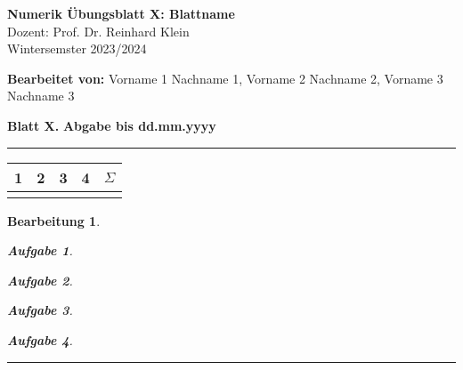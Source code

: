 \documentclass[12pt]{article}
\theoremstyle{Aufgabe_Style}
\newtheorem{Aufgabe}{Aufgabe}
\theoremstyle{Bearbeitung_Style}
\newtheorem*{Bearbeitung}{Bearbeitung}
\begin{document}
\newcommand{\studentnames}{Vorname 1 Nachname 1, Vorname 2 Nachname 2, Vorname 3 Nachname 3}
\newcommand{\sheetnumber}{X}
\newcommand{\sheetname}{Blattname}
\newcommand{\duedate}{dd.mm.yyyy}


\begin{center}
{\Large\bf Numerik Übungsblatt \sheetnumber: \sheetname} \\
\bigskip
{\large Dozent: Prof. Dr. Reinhard Klein} \\
\smallskip
{\small Wintersemster 2023/2024}  \\
\medskip
\end{center}
 \begin{center}
 {{\color{blue}\bfseries Bearbeitet von:} \studentnames}
 \end{center}

\bigskip

\textbf{\large Blatt \sheetnumber.} \hfill
\textbf{Abgabe bis \duedate\ }

\smallskip 
\hrule


 \begin{flushright}
  \begin{tabular}{c|c|c|c|c}
  1 & 2 & 3 & 4 & $\Sigma$ \\
  \hline
  \hspace{1cm} & \hspace{1cm} & \hspace{1cm} & \hspace{1cm} & \hspace{1cm} \\[0.5cm]
 \end{tabular}
 \end{flushright}



\begin{Bearbeitung}

  \begin{Aufgabe}
  \end{Aufgabe}

  \begin{Aufgabe}
  \end{Aufgabe}

  \begin{Aufgabe}
  \end{Aufgabe}

  \begin{Aufgabe}
  \end{Aufgabe}

\end{Bearbeitung}

\vspace{0.5cm}
\hrule
\vspace{0.5cm}
\end{document}
